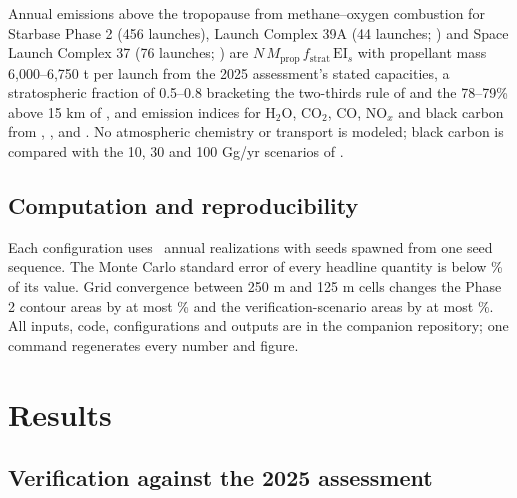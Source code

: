 \documentclass[preprint,12pt,authoryear]{elsarticle}
\begin{document}
Annual emissions above the tropopause from methane--oxygen combustion for Starbase Phase 2 (456 launches), Launch Complex 39A (44 launches; \citealp{noaksc2026}) and Space Launch Complex 37 (76 launches; \citealp{rodslc37}) are $N\,M_{\mathrm{prop}}\,f_{\mathrm{strat}}\,\mathrm{EI}_s$ with propellant mass 6,000--6,750 t per launch from the 2025 assessment's stated capacities, a stratospheric fraction of 0.5--0.8 bracketing the two-thirds rule of \citet{ross2014} and the 78--79\% above 15 km of \citet{ryan2022}, and emission indices for H$_2$O, CO$_2$, CO, NO$_x$ and black carbon from \citet{barker2024}, \citet{ross2014}, \citet{ryan2022} and \citet{tsigaridis2024}. No atmospheric chemistry or transport is modeled; black carbon is compared with the 10, 30 and 100 Gg/yr scenarios of \citet{maloney2022}.

\subsection{Computation and reproducibility}

Each configuration uses \valMcNRealizations~annual realizations with seeds spawned from one seed sequence. The Monte Carlo standard error of every headline quantity is below \valMcMaxSeFractionPct\% of its value. Grid convergence between 250 m and 125 m cells changes the Phase 2 contour areas by at most \valConvPhaseTwoMaxRelPct\% and the verification-scenario areas by at most \valConvVerifMaxRelPct\%. All inputs, code, configurations and outputs are in the companion repository; one command regenerates every number and figure.

\section{Results}
\label{sec:results}

\subsection{Verification against the 2025 assessment}
\end{document}
